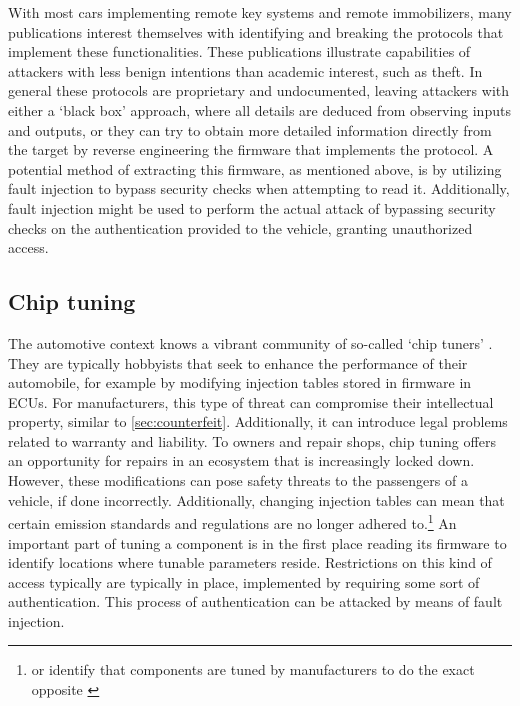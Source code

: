 \documentclass[10pt]{article}
\begin{document}
        With most cars implementing remote key systems and remote immobilizers, many publications \cite{garcia_lock_2016,kasper_breaking_2009,verdult_dismantling_2015} interest themselves with identifying and breaking the protocols that implement these functionalities. These publications illustrate capabilities of attackers with less benign intentions than academic interest, such as theft. In general these protocols are proprietary and undocumented, leaving attackers with either a `black box' approach, where all details are deduced from observing inputs and outputs, or they can try to obtain more detailed information directly from the target by reverse engineering the firmware that implements the protocol. A potential method of extracting this firmware, as mentioned above, is by utilizing fault injection to bypass security checks when attempting to read it. Additionally, fault injection might be used to perform the actual attack of bypassing security checks on the authentication provided to the vehicle, granting unauthorized access.



      \subsection{Chip tuning}
      \label{sec:tune}

        The automotive context knows a vibrant community of so-called `chip tuners' \cite{brians_cyber_2016,wasicek_copy_2012}. They are typically hobbyists that seek to enhance the performance of their automobile, for example by modifying injection tables stored in firmware in ECUs. For manufacturers, this type of threat can compromise their intellectual property, similar to \autoref{sec:counterfeit}. Additionally, it can introduce legal problems related to warranty and liability. To owners and repair shops, chip tuning offers an opportunity for repairs in an ecosystem that is increasingly locked down. However, these modifications can pose safety threats to the passengers of a vehicle, if done incorrectly. Additionally, changing injection tables can mean that certain emission standards and regulations are no longer adhered to.\footnote{or identify that components are tuned by manufacturers to do the exact opposite \cite{lange_exhaust_2015}} 
        An important part of tuning a component is in the first place reading its firmware to identify locations where tunable parameters reside. Restrictions on this kind of access typically are typically in place, implemented by requiring some sort of authentication. This process of authentication can be attacked by means of fault injection. %
\end{document}
